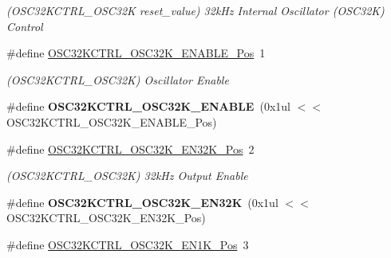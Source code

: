 \begin{DoxyCompactItemize}
\begin{DoxyCompactList}\small\item\em (O\+S\+C32\+K\+C\+T\+R\+L\+\_\+\+O\+S\+C32\+K reset\+\_\+value) 32k\+Hz Internal Oscillator (O\+S\+C32\+K) Control \end{DoxyCompactList}\item 
\hypertarget{group___s_a_m_l21___o_s_c32_k_c_t_r_l_gae3a0094c7504e2a29e461a11bb357a3a}{}\#define \hyperlink{group___s_a_m_l21___o_s_c32_k_c_t_r_l_gae3a0094c7504e2a29e461a11bb357a3a}{O\+S\+C32\+K\+C\+T\+R\+L\+\_\+\+O\+S\+C32\+K\+\_\+\+E\+N\+A\+B\+L\+E\+\_\+\+Pos}~1\label{group___s_a_m_l21___o_s_c32_k_c_t_r_l_gae3a0094c7504e2a29e461a11bb357a3a}

\begin{DoxyCompactList}\small\item\em (O\+S\+C32\+K\+C\+T\+R\+L\+\_\+\+O\+S\+C32\+K) Oscillator Enable \end{DoxyCompactList}\item 
\hypertarget{group___s_a_m_l21___o_s_c32_k_c_t_r_l_gaa8a952862619dd21d3bfb89b9649e2cd}{}\#define {\bfseries O\+S\+C32\+K\+C\+T\+R\+L\+\_\+\+O\+S\+C32\+K\+\_\+\+E\+N\+A\+B\+L\+E}~(0x1ul $<$$<$ O\+S\+C32\+K\+C\+T\+R\+L\+\_\+\+O\+S\+C32\+K\+\_\+\+E\+N\+A\+B\+L\+E\+\_\+\+Pos)\label{group___s_a_m_l21___o_s_c32_k_c_t_r_l_gaa8a952862619dd21d3bfb89b9649e2cd}

\item 
\hypertarget{group___s_a_m_l21___o_s_c32_k_c_t_r_l_gaabdd32a033a1270ad847853b4ea28ca5}{}\#define \hyperlink{group___s_a_m_l21___o_s_c32_k_c_t_r_l_gaabdd32a033a1270ad847853b4ea28ca5}{O\+S\+C32\+K\+C\+T\+R\+L\+\_\+\+O\+S\+C32\+K\+\_\+\+E\+N32\+K\+\_\+\+Pos}~2\label{group___s_a_m_l21___o_s_c32_k_c_t_r_l_gaabdd32a033a1270ad847853b4ea28ca5}

\begin{DoxyCompactList}\small\item\em (O\+S\+C32\+K\+C\+T\+R\+L\+\_\+\+O\+S\+C32\+K) 32k\+Hz Output Enable \end{DoxyCompactList}\item 
\hypertarget{group___s_a_m_l21___o_s_c32_k_c_t_r_l_ga441d36f978d639ef622ecdb774174dd4}{}\#define {\bfseries O\+S\+C32\+K\+C\+T\+R\+L\+\_\+\+O\+S\+C32\+K\+\_\+\+E\+N32\+K}~(0x1ul $<$$<$ O\+S\+C32\+K\+C\+T\+R\+L\+\_\+\+O\+S\+C32\+K\+\_\+\+E\+N32\+K\+\_\+\+Pos)\label{group___s_a_m_l21___o_s_c32_k_c_t_r_l_ga441d36f978d639ef622ecdb774174dd4}

\item 
\hypertarget{group___s_a_m_l21___o_s_c32_k_c_t_r_l_gab012ee10e42dc48b28ab27a57f3a3658}{}\#define \hyperlink{group___s_a_m_l21___o_s_c32_k_c_t_r_l_gab012ee10e42dc48b28ab27a57f3a3658}{O\+S\+C32\+K\+C\+T\+R\+L\+\_\+\+O\+S\+C32\+K\+\_\+\+E\+N1\+K\+\_\+\+Pos}~3\label{group___s_a_m_l21___o_s_c32_k_c_t_r_l_gab012ee10e42dc48b28ab27a57f3a3658}


\end{DoxyCompactItemize}

